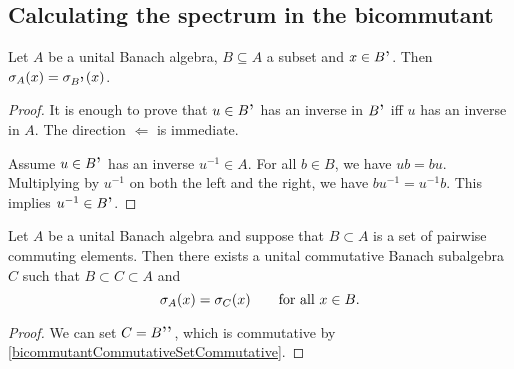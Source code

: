 \subsection{Calculating the spectrum in the bicommutant}
\begin{proposition}
Let $A$ be a unital Banach algebra, $B\subseteq A$ a subset and $x\in B^{\comm}$. Then $\spec_A(x) = \spec_{B^{\comm}}(x)$.
\end{proposition}
\begin{proof}
It is enough to prove that $u\in B^{\comm}$ has an inverse in $B^{\comm}$ iff $u$ has an inverse in $A$. The direction $\Leftarrow$ is immediate.

Assume $u\in B^{\comm}$ has an inverse $u^{-1}\in A$. For all $b\in B$, we have $ub = bu$. Multiplying by $u^{-1}$ on both the left and the right, we have $bu^{-1} = u^{-1}b$. This implies $u^{-1}\in B^{\comm}$.
\end{proof}
\begin{corollary} \label{spectrumInCommutativeAlgebra}
Let $A$ be a unital Banach algebra and suppose that $B\subset A$ is a set of pairwise commuting elements. Then there exists a unital commutative Banach subalgebra $C$ such that $B\subset C\subset A$ and
\[ \sigma_A(x) = \sigma_C(x) \qquad \text{for all $x\in B$.} \]
\end{corollary}
\begin{proof}
We can set $C = B^{\comm\comm}$, which is commutative by \ref{bicommutantCommutativeSetCommutative}.
\end{proof}

